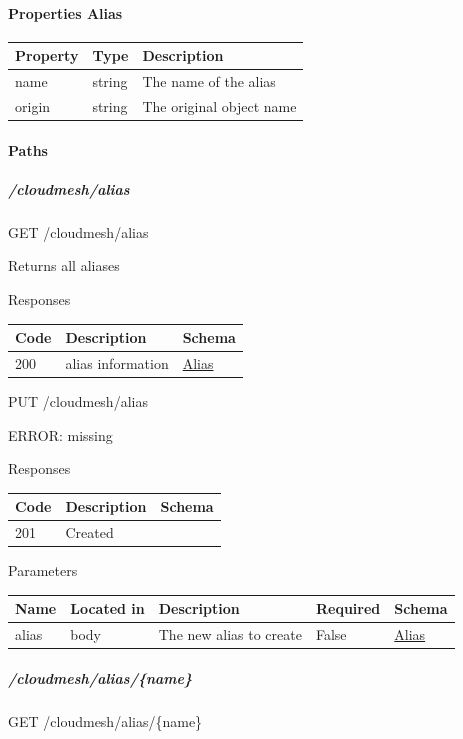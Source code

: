\documentclass[9pt,]{article}
\let\oldparagraph\paragraph
\renewcommand{\paragraph}[1]{\oldparagraph{#1}\mbox{}}
\let\oldsubparagraph\subparagraph
\renewcommand{\subparagraph}[1]{\oldsubparagraph{#1}\mbox{}}
\begin{document}
\hypertarget{properties-alias}{%
\paragraph{Properties Alias}\label{properties-alias}}

\begin{longtable}[]{@{}lll@{}}
\toprule
Property & Type & Description\tabularnewline
\midrule
\endhead
name & string & The name of the alias\tabularnewline
origin & string & The original object name\tabularnewline
\bottomrule
\end{longtable}

\hypertarget{paths-4}{%
\paragraph{Paths}\label{paths-4}}

\hypertarget{cloudmeshalias}{%
\subparagraph{/cloudmesh/alias}\label{cloudmeshalias}}

GET /cloudmesh/alias

Returns all aliases

Responses

\begin{longtable}[]{@{}lll@{}}
\toprule
Code & Description & Schema\tabularnewline
\midrule
\endhead
200 & alias information &
\protect\hyperlink{alias}{Alias}\tabularnewline
\bottomrule
\end{longtable}

PUT /cloudmesh/alias

ERROR: missing

Responses

\begin{longtable}[]{@{}lll@{}}
\toprule
Code & Description & Schema\tabularnewline
\midrule
\endhead
201 & Created &\tabularnewline
\bottomrule
\end{longtable}

Parameters

\begin{longtable}[]{@{}lllll@{}}
\toprule
Name & Located in & Description & Required & Schema\tabularnewline
\midrule
\endhead
alias & body & The new alias to create & False &
\protect\hyperlink{alias}{Alias}\tabularnewline
\bottomrule
\end{longtable}

\hypertarget{cloudmeshaliasname}{%
\subparagraph{/cloudmesh/alias/\{name\}}\label{cloudmeshaliasname}}

GET /cloudmesh/alias/\{name\}
\end{document}
